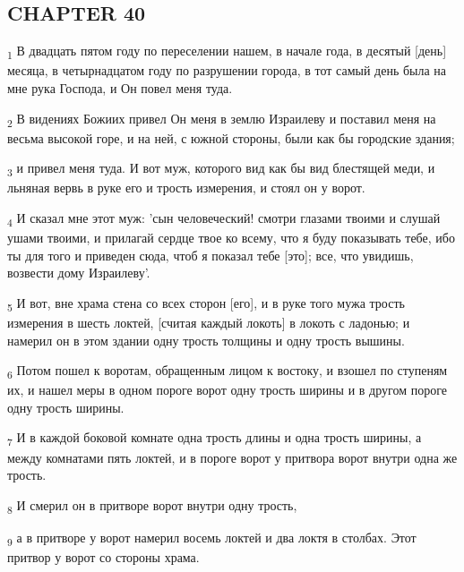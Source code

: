 \subsection{CHAPTER 40}
\begin{tcolorbox}
\textsubscript{1} В двадцать пятом году по переселении нашем, в начале года, в десятый [день] месяца, в четырнадцатом году по разрушении города, в тот самый день была на мне рука Господа, и Он повел меня туда.
\end{tcolorbox}
\begin{tcolorbox}
\textsubscript{2} В видениях Божиих привел Он меня в землю Израилеву и поставил меня на весьма высокой горе, и на ней, с южной стороны, были как бы городские здания;
\end{tcolorbox}
\begin{tcolorbox}
\textsubscript{3} и привел меня туда. И вот муж, которого вид как бы вид блестящей меди, и льняная вервь в руке его и трость измерения, и стоял он у ворот.
\end{tcolorbox}
\begin{tcolorbox}
\textsubscript{4} И сказал мне этот муж: 'сын человеческий! смотри глазами твоими и слушай ушами твоими, и прилагай сердце твое ко всему, что я буду показывать тебе, ибо ты для того и приведен сюда, чтоб я показал тебе [это]; все, что увидишь, возвести дому Израилеву'.
\end{tcolorbox}
\begin{tcolorbox}
\textsubscript{5} И вот, вне храма стена со всех сторон [его], и в руке того мужа трость измерения в шесть локтей, [считая каждый локоть] в локоть с ладонью; и намерил он в этом здании одну трость толщины и одну трость вышины.
\end{tcolorbox}
\begin{tcolorbox}
\textsubscript{6} Потом пошел к воротам, обращенным лицом к востоку, и взошел по ступеням их, и нашел меры в одном пороге ворот одну трость ширины и в другом пороге одну трость ширины.
\end{tcolorbox}
\begin{tcolorbox}
\textsubscript{7} И в каждой боковой комнате одна трость длины и одна трость ширины, а между комнатами пять локтей, и в пороге ворот у притвора ворот внутри одна же трость.
\end{tcolorbox}
\begin{tcolorbox}
\textsubscript{8} И смерил он в притворе ворот внутри одну трость,
\end{tcolorbox}
\begin{tcolorbox}
\textsubscript{9} а в притворе у ворот намерил восемь локтей и два локтя в столбах. Этот притвор у ворот со стороны храма.
\end{tcolorbox}
